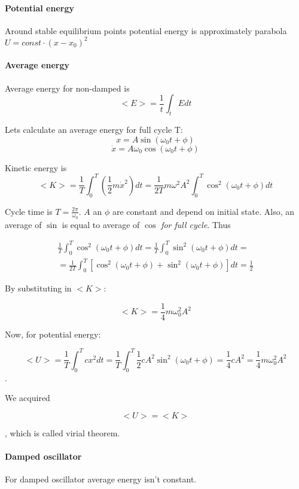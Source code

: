 \paragraph{Potential energy}
Around stable equilibrium points potential energy is approximately parabola $U = const \cdot (x-x_0)^2$
\paragraph{Average energy}
Average energy for non-damped is
$$<E> = \frac{1}{t} \int_{t} E dt$$

Lets calculate an average energy for full cycle T:
$$x = A \sin \left( \omega_0 t + \phi \right)$$
$$\dot{x} = A \omega_0 \cos \left( \omega_0 t + \phi \right)$$

Kinetic energy is
$$<K> = \frac{1}{T} \int_0^T \left( \frac{1}{2} m \dot{x}^2 \right) dt = \frac{1}{2T}m\omega^2 A^2 \int_0^T \cos^2 \left( \omega_0 t + \phi \right) dt$$

Cycle time is $T=\frac{2\pi}{\omega_0}$. $A$ an $\phi$ are constant and depend on initial state. Also, an average of $\sin$ is equal to average of $\cos$ \textit{for full cycle}. Thus

\begin{align*}
\frac{1}{T}\int_0^T\cos^2  \left( \omega_0 t + \phi \right) dt  = \frac{1}{T}\int_0^T \sin^2  \left( \omega_0 t + \phi \right) dt =\\= \frac{1}{2T}\int_0^T \left[ \cos^2  \left( \omega_0 t + \phi \right) + \sin^2  \left( \omega_0 t + \phi \right) \right] dt = \frac{1}{2}
\end{align*}

By substituting in $<K>$:

$$<K> = \frac{1}{4}m\omega_0^2A^2$$


Now, for potential energy:

$$<U> = \frac{1}{T} \int_0^T cx^2 dt = \frac{1}{T} \int^T_0 \frac{1}{2} cA^2 \sin^2 \left( \omega_0 t + \phi \right)  = \frac{1}{4}cA^2 = \frac{1}{4} m\omega_0^2A^2$$.

We acquired

$$<U> = <K>$$

, which is called virial theorem.

\paragraph{Damped oscillator}

For damped oscillator average energy isn't constant.

